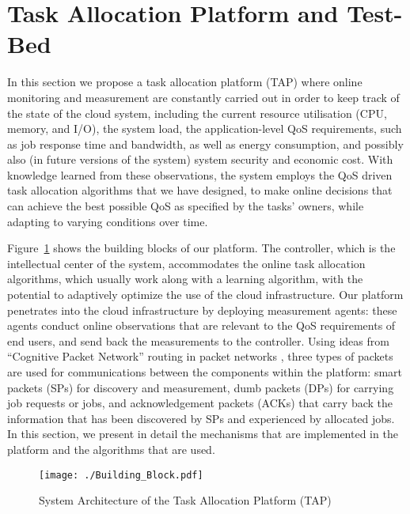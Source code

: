 \documentclass[journal]{IEEEtran}
\begin{document}
\section{Task Allocation Platform and Test-Bed} \label{task}
\label{research}





In this section we propose a task allocation platform (TAP) where online monitoring and measurement are constantly carried out in order to keep track of the state of the cloud system, including the current resource utilisation (CPU, memory, and I/O), the system load, the application-level QoS requirements, such as job response time and bandwidth, as well as energy consumption, and possibly also (in future versions of the system) system security and economic cost. With knowledge learned from these observations,  the system employs the QoS driven task allocation algorithms that we have designed, to make online decisions that can achieve the best possible QoS as specified by the tasks' owners, while adapting to varying conditions over time. 

Figure~\ref{fig:platform} shows the building blocks of our platform. The controller, which is the intellectual center of the system, accommodates the online task allocation algorithms, which usually work along with a learning algorithm, with the potential to adaptively optimize the use of the cloud infrastructure. Our platform penetrates into the cloud infrastructure by deploying measurement agents: these agents conduct online observations that are relevant to the QoS requirements of end users, and send back the measurements to the controller. Using ideas from ``Cognitive Packet Network'' routing in packet networks \cite{TAI,network1}, three types of packets are used for communications between the components within the platform: smart packets (SPs) for discovery and measurement, dumb packets (DPs) for carrying job requests or jobs, and acknowledgement packets (ACKs) that carry back the information that has been discovered by SPs and experienced by allocated jobs. In this section, we present in detail the mechanisms that are implemented  in the platform and the algorithms that are used.

		\begin{figure}[ht]
     \centering
      \texttt{[image: ./Building\_Block.pdf]} \caption{System Architecture of the Task Allocation Platform (TAP)}
     \label{fig:platform}
    \end{figure}
 
\end{document}
